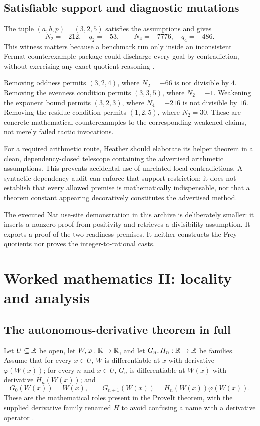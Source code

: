 \documentclass[11pt,letterpaper]{article}
\theoremstyle{definition}\newtheorem{definition}[theorem]{Definition}
\theoremstyle{remark}\newtheorem{remark}[theorem]{Remark}
\begin{document}
\subsection{Satisfiable support and diagnostic mutations}
The tuple $(a,b,p)=(3,2,5)$ satisfies the assumptions and gives
\[
 N_2=-212,\quad q_2=-53,\qquad N_4=-7776,\quad q_4=-486.
\]
This witness matters because a benchmark run only inside an inconsistent
Fermat counterexample package could discharge every goal by contradiction,
without exercising any exact-quotient reasoning \cite{round3a,round3b}.

Removing oddness permits $(3,2,4)$, where $N_2=-66$ is not divisible by $4$.
Removing the evenness condition permits $(3,3,5)$, where $N_2=-1$.
Weakening the exponent bound permits $(3,2,3)$, where $N_4=-216$ is not divisible
by $16$. Removing the residue condition permits $(1,2,5)$, where $N_2=30$.
These are concrete mathematical counterexamples to the corresponding weakened
claims, not merely failed tactic invocations.

For a required arithmetic route, Heather should elaborate its helper theorem
in a clean, dependency-closed telescope containing the advertised arithmetic
assumptions. This prevents accidental use of unrelated local contradictions.
A syntactic dependency audit can enforce that support restriction; it does not
establish that every allowed premise is mathematically indispensable, nor
that a theorem constant appearing decoratively constitutes the advertised
method.

The executed Nat use-site demonstration in this archive is deliberately
smaller: it inserts a nonzero proof from positivity and retrieves a divisibility
assumption. It exports a proof of the two readiness premises. It neither
constructs the Frey quotients nor proves the integer-to-rational casts.

\section{Worked mathematics II: locality and analysis}\label{sec:analysis}

\subsection{The autonomous-derivative theorem in full}
Let $U\subseteq\mathbb R$ be open, let $W,\varphi:\mathbb R\to\mathbb R$, and let
$G_n,H_n:\mathbb R\to\mathbb R$ be families. Assume that for every $x\in U$,
$W$ is differentiable at $x$ with derivative $\varphi(W(x))$; for every $n$
and $x\in U$, $G_n$ is differentiable at $W(x)$ with derivative $H_n(W(x))$;
and
\[
 G_0(W(x))=W(x),\qquad
 G_{n+1}(W(x))=H_n(W(x))\varphi(W(x)).
\]
These are the mathematical roles present in the ProveIt theorem, with the
supplied derivative family renamed $H$ to avoid confusing a name with a
derivative operator \cite{autonomous}.
\end{document}
